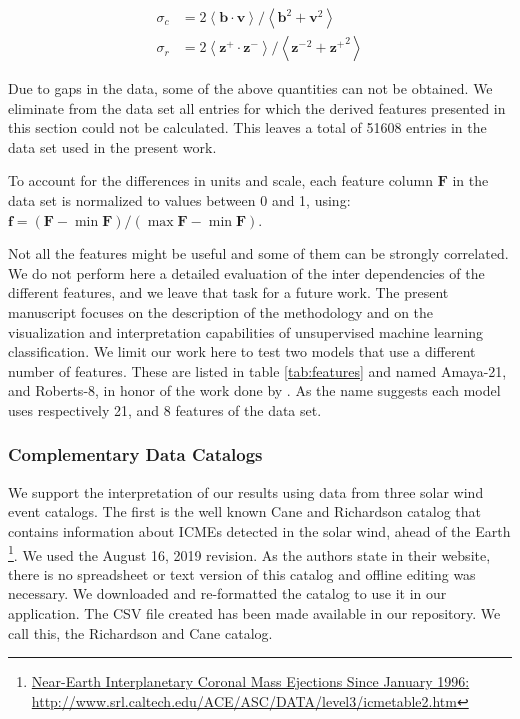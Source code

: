 \documentclass[utf8]{frontiersSCNS} %
\begin{document}
\begin{align}
\sigma_c & = 2 \left< \boldsymbol{b}\cdot\boldsymbol{v}\right>/\left<\boldsymbol{b}^2 + \boldsymbol{v}^2\right> \label{eq:sigmac} \\
\sigma_r & = 2 \left< \boldsymbol{z^+}\cdot\boldsymbol{z^-}\right>/\left<\boldsymbol{z^-}^2 + \boldsymbol{z^+}^2\right> \label{eq:sigmar}
\end{align}

Due to gaps in the data, some of the above quantities can not be obtained. We eliminate from the data set all entries for which the derived features presented in this section could not be calculated. This leaves a total of 51608 entries in the data set used in the present work.

To account for the differences in units and scale, each feature column $\boldsymbol{F}$ in the data set is normalized to values between 0 and 1, using: $\boldsymbol{f}=\left(\boldsymbol{F}-\min{\boldsymbol{F}}\right) /\left(\max{\boldsymbol{F}}-\min{\boldsymbol{F}}\right)$.

Not all the features might be useful and some of them can be strongly correlated. We do not perform here a detailed evaluation of the inter dependencies of the different features, and we leave that task for a future work. The present manuscript focuses on the description of the methodology and on the visualization and interpretation capabilities of unsupervised machine learning classification. We limit our work here to test two models that use a different number of features. These are listed in table \ref{tab:features} and named Amaya-21, and Roberts-8, in honor of the work done by \citep{Roberts2020}. As the name suggests each model uses respectively 21, and 8 features of the data set. 

\subsubsection{Complementary Data Catalogs}
We support the interpretation of our results using data from three solar wind event catalogs. The first is the well known Cane and Richardson catalog that contains information about ICMEs detected in the solar wind, ahead of the Earth \citep{Cane2003} \citep{Richardson2010} \footnote{\href{http://www.srl.caltech.edu/ACE/ASC/DATA/level3/icmetable2.htm}{Near-Earth Interplanetary Coronal Mass Ejections Since January 1996: http://www.srl.caltech.edu/ACE/ASC/DATA/level3/icmetable2.htm}}. We used the August 16, 2019 revision. As the authors state in their website, there is no spreadsheet or text version of this catalog and offline editing was necessary. We downloaded and re-formatted the catalog to use it in our application. The CSV file created has been made available in our repository. We call this, the Richardson and Cane catalog. 
\end{document}

